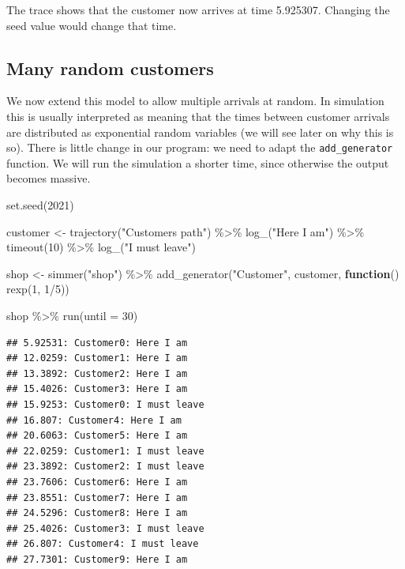 \documentclass[
]{book}
\newenvironment{Shaded}{\begin{snugshade}}{\end{snugshade}}
\newcommand{\AttributeTok}[1]{\textcolor[rgb]{0.77,0.63,0.00}{#1}}
\newcommand{\ControlFlowTok}[1]{\textcolor[rgb]{0.13,0.29,0.53}{\textbf{#1}}}
\newcommand{\DecValTok}[1]{\textcolor[rgb]{0.00,0.00,0.81}{#1}}
\newcommand{\FunctionTok}[1]{\textcolor[rgb]{0.00,0.00,0.00}{#1}}
\newcommand{\NormalTok}[1]{#1}
\newcommand{\OtherTok}[1]{\textcolor[rgb]{0.56,0.35,0.01}{#1}}
\newcommand{\SpecialCharTok}[1]{\textcolor[rgb]{0.00,0.00,0.00}{#1}}
\newcommand{\StringTok}[1]{\textcolor[rgb]{0.31,0.60,0.02}{#1}}
\begin{document}
The trace shows that the customer now arrives at time 5.925307. Changing the seed value would change that time.

\hypertarget{many-random-customers}{%
\subsection{Many random customers}\label{many-random-customers}}

We now extend this model to allow multiple arrivals at random. In simulation this is usually interpreted as meaning that the times between customer arrivals are distributed as exponential random variables (we will see later on why this is so). There is little change in our program: we need to adapt the \texttt{add\_generator} function. We will run the simulation a shorter time, since otherwise the output becomes massive.

\begin{Shaded}
\begin{Highlighting}[]
\FunctionTok{set.seed}\NormalTok{(}\DecValTok{2021}\NormalTok{)}

\NormalTok{customer }\OtherTok{\textless{}{-}}
  \FunctionTok{trajectory}\NormalTok{(}\StringTok{"Customer\textquotesingle{}s path"}\NormalTok{) }\SpecialCharTok{\%\textgreater{}\%}
  \FunctionTok{log\_}\NormalTok{(}\StringTok{"Here I am"}\NormalTok{) }\SpecialCharTok{\%\textgreater{}\%}
  \FunctionTok{timeout}\NormalTok{(}\DecValTok{10}\NormalTok{) }\SpecialCharTok{\%\textgreater{}\%}
  \FunctionTok{log\_}\NormalTok{(}\StringTok{"I must leave"}\NormalTok{)}

\NormalTok{shop }\OtherTok{\textless{}{-}}
  \FunctionTok{simmer}\NormalTok{(}\StringTok{"shop"}\NormalTok{) }\SpecialCharTok{\%\textgreater{}\%}
  \FunctionTok{add\_generator}\NormalTok{(}\StringTok{"Customer"}\NormalTok{, customer, }\ControlFlowTok{function}\NormalTok{() }\FunctionTok{rexp}\NormalTok{(}\DecValTok{1}\NormalTok{, }\DecValTok{1}\SpecialCharTok{/}\DecValTok{5}\NormalTok{))}

\NormalTok{shop }\SpecialCharTok{\%\textgreater{}\%} \FunctionTok{run}\NormalTok{(}\AttributeTok{until =} \DecValTok{30}\NormalTok{)}
\end{Highlighting}
\end{Shaded}

\begin{verbatim}
## 5.92531: Customer0: Here I am
## 12.0259: Customer1: Here I am
## 13.3892: Customer2: Here I am
## 15.4026: Customer3: Here I am
## 15.9253: Customer0: I must leave
## 16.807: Customer4: Here I am
## 20.6063: Customer5: Here I am
## 22.0259: Customer1: I must leave
## 23.3892: Customer2: I must leave
## 23.7606: Customer6: Here I am
## 23.8551: Customer7: Here I am
## 24.5296: Customer8: Here I am
## 25.4026: Customer3: I must leave
## 26.807: Customer4: I must leave
## 27.7301: Customer9: Here I am
\end{verbatim}
\end{document}
